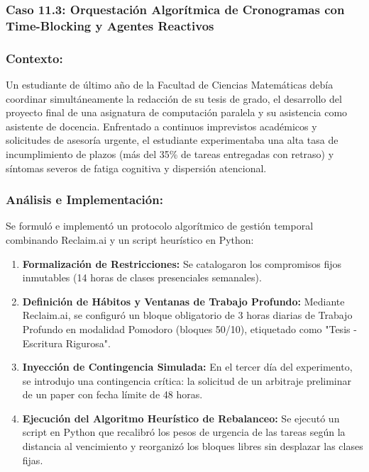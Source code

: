 \subsubsection{Caso 11.3: Orquestación Algorítmica de Cronogramas con Time-Blocking y Agentes Reactivos}

\subsubsection*{Contexto:}
Un estudiante de último año de la Facultad de Ciencias Matemáticas debía coordinar simultáneamente la redacción de su tesis de grado, el desarrollo del proyecto final de una asignatura de computación paralela y su asistencia como asistente de docencia. Enfrentado a continuos imprevistos académicos y solicitudes de asesoría urgente, el estudiante experimentaba una alta tasa de incumplimiento de plazos (más del 35\% de tareas entregadas con retraso) y síntomas severos de fatiga cognitiva y dispersión atencional.

\subsubsection*{Análisis e Implementación:}
Se formuló e implementó un protocolo algorítmico de gestión temporal combinando Reclaim.ai y un script heurístico en Python:

\begin{enumerate}
    \item \textbf{Formalización de Restricciones:} Se catalogaron los compromisos fijos inmutables (14 horas de clases presenciales semanales).
    \item \textbf{Definición de Hábitos y Ventanas de Trabajo Profundo:} Mediante Reclaim.ai, se configuró un bloque obligatorio de 3 horas diarias de Trabajo Profundo en modalidad Pomodoro (bloques 50/10), etiquetado como "Tesis - Escritura Rigurosa".
    \item \textbf{Inyección de Contingencia Simulada:} En el tercer día del experimento, se introdujo una contingencia crítica: la solicitud de un arbitraje preliminar de un paper con fecha límite de 48 horas.
    \item \textbf{Ejecución del Algoritmo Heurístico de Rebalanceo:} Se ejecutó un script en Python que recalibró los pesos de urgencia de las tareas según la distancia al vencimiento y reorganizó los bloques libres sin desplazar las clases fijas.
\end{enumerate}

